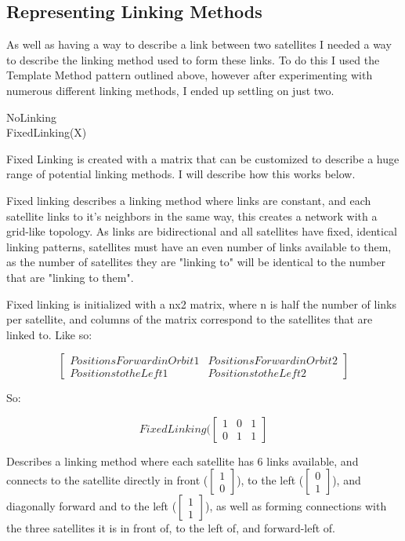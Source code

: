 \documentclass[12pt,a4paper,twoside,openright]{report}
\begin{document}
\subsection{Representing Linking Methods}
As well as having a way to describe a link between two satellites I needed a way to describe the linking method used to form these links. To do this I used the Template Method pattern outlined above, however after experimenting with numerous different linking methods, I ended up settling on just two.

\begin{description}
\item[NoLinking]
\item[FixedLinking(X)]
\end{description}

Fixed Linking is created with a matrix that can be customized to describe a huge range of potential linking methods. I will describe how this works below.

Fixed linking describes a linking method where links are constant, and each satellite links to it's neighbors in the same way, this creates a network with a grid-like topology. As links are bidirectional and all satellites have fixed, identical linking patterns, satellites must have an even number of links available to them, as the number of satellites they are "linking to" will be identical to the number that are "linking to them".

Fixed linking is initialized with a nx2 matrix, where n is half the number of links per satellite, and columns of the matrix correspond to the satellites that are linked to. Like so:

\[\begin{bmatrix} 
Positions Forward in Orbit 1 & Positions Forward in Orbit 2 \\
Positions to the Left 1 & Positions to the Left 2\end{bmatrix}\]

So:

\[FixedLinking(\begin{bmatrix} 
1 & 0 & 1 \\
0 & 1 & 1\end{bmatrix}\]

Describes a linking method where each satellite has 6 links available, and connects to the satellite directly in front ($\begin{bmatrix}1\\0\end{bmatrix}$), to the left ($\begin{bmatrix}0\\1\end{bmatrix}$), and diagonally forward and to the left ($\begin{bmatrix}1\\1\end{bmatrix}$), as well as forming connections with the three satellites it is in front of, to the left of, and forward-left of.
\end{document}
